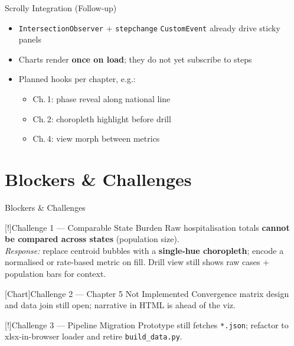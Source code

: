 \documentclass[aspectratio=169]{beamer}
\begin{document}
\begin{frame}{Scrolly Integration (Follow-up)}
  \begin{itemize}
    \item \texttt{IntersectionObserver} + \texttt{stepchange} \texttt{CustomEvent} already drive sticky panels
    \item Charts render \textbf{once on load}; they do not yet subscribe to steps
    \item Planned hooks per chapter, e.g.:
    \begin{itemize}
      \item Ch.\,1: phase reveal along national line
      \item Ch.\,2: choropleth highlight before drill
      \item Ch.\,4: view morph between metrics
    \end{itemize}
  \end{itemize}
  \vspace{0.5em}
\end{frame}

\section{Blockers \& Challenges}

\begin{frame}{Blockers \& Challenges}
  \begin{block}{[!]\quad Challenge 1 --- Comparable State Burden}
    Raw hospitalisation totals \textbf{cannot be compared across states} (population size).\\
    \smallskip
    \textit{Response:} replace centroid bubbles with a \textbf{single-hue choropleth}; encode a normalised or rate-based metric on fill. Drill view still shows raw cases + population bars for context.
  \end{block}

  \vspace{0.4em}

  \begin{block}{[Chart]\quad Challenge 2 --- Chapter 5 Not Implemented}
    Convergence matrix design and data join still open; narrative in HTML is ahead of the viz.
  \end{block}

  \vspace{0.4em}

  \begin{alertblock}{[!]\quad Challenge 3 --- Pipeline Migration}
    Prototype still fetches \texttt{*.json}; refactor to xlsx-in-browser loader and retire \texttt{build\_data.py}.
  \end{alertblock}
\end{frame}
\end{document}
